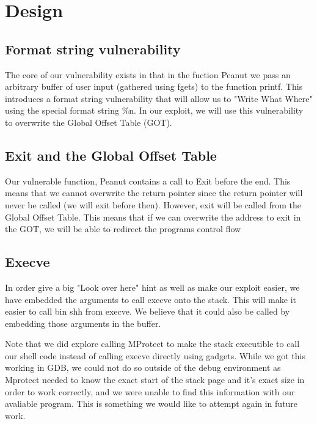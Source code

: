 \section{Design}
\subsection{Format string vulnerability}
The core of our vulnerability exists in that in the fuction Peanut we pass an arbitrary buffer of user input (gathered using fgets) to the function printf. This introduces a format string vulnerability that will allow us to "Write What Where" using the special format string \%n. In our exploit, we will use this vulnerability to overwrite the Global Offset Table (GOT).
\subsection{Exit and the Global Offset Table}
Our vulnerable function, Peanut contains a call to Exit before the end. This means that we cannot overwrite the return pointer since the return pointer will never be called (we will exit before then). However, exit will be called from the Global Offset Table. This means that if we can overwrite the address to exit in the GOT, we will be able to redirect the programs control flow
\subsection{Execve}
In order give a big "Look over here" hint as well as make our exploit easier, we have embedded the arguments to call execve onto the stack. This will make it easier to call bin shh from execve. We believe that it could also be called by embedding those arguments in the buffer. 

Note that we did explore calling MProtect to make the stack executible to call our shell code instead of calling execve directly using gadgets. While we got this working in GDB, we could not do so outside of the debug environment as Mprotect needed to know the exact start of the stack page and it's exact size in order to work correctly, and we were unable to find this information with our avaliable program. This is something we would like to attempt again in future work.